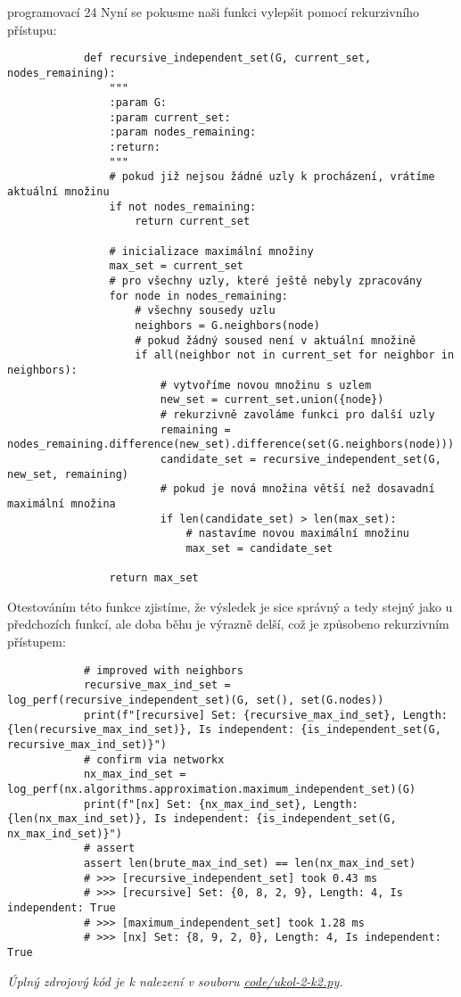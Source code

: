 \documentclass[10pt, a4paper]{ReportSheet}
\begin{document}
\begin{uloha}{programovací 2}{4}
        Nyní se pokusme naši funkci vylepšit pomocí rekurzivního přístupu:
        \begin{verbatim}
            def recursive_independent_set(G, current_set, nodes_remaining):
                """
                :param G:
                :param current_set:
                :param nodes_remaining:
                :return:
                """
                # pokud již nejsou žádné uzly k procházení, vrátíme aktuální množinu
                if not nodes_remaining:
                    return current_set

                # inicializace maximální množiny
                max_set = current_set
                # pro všechny uzly, které ještě nebyly zpracovány
                for node in nodes_remaining:
                    # všechny sousedy uzlu
                    neighbors = G.neighbors(node)
                    # pokud žádný soused není v aktuální množině
                    if all(neighbor not in current_set for neighbor in neighbors):
                        # vytvoříme novou množinu s uzlem
                        new_set = current_set.union({node})
                        # rekurzivně zavoláme funkci pro další uzly
                        remaining = nodes_remaining.difference(new_set).difference(set(G.neighbors(node)))
                        candidate_set = recursive_independent_set(G, new_set, remaining)
                        # pokud je nová množina větší než dosavadní maximální množina
                        if len(candidate_set) > len(max_set):
                            # nastavíme novou maximální množinu
                            max_set = candidate_set

                return max_set
        \end{verbatim}

        \clearpage
        Otestováním této funkce zjistíme, že výsledek je sice správný a tedy stejný jako u předchozích funkcí, ale doba
        běhu je výrazně delší, což je způsobeno rekurzivním přístupem:
        \begin{verbatim}
            # improved with neighbors
            recursive_max_ind_set = log_perf(recursive_independent_set)(G, set(), set(G.nodes))
            print(f"[recursive] Set: {recursive_max_ind_set}, Length: {len(recursive_max_ind_set)}, Is independent: {is_independent_set(G, recursive_max_ind_set)}")
            # confirm via networkx
            nx_max_ind_set = log_perf(nx.algorithms.approximation.maximum_independent_set)(G)
            print(f"[nx] Set: {nx_max_ind_set}, Length: {len(nx_max_ind_set)}, Is independent: {is_independent_set(G, nx_max_ind_set)}")
            # assert
            assert len(brute_max_ind_set) == len(nx_max_ind_set)
            # >>> [recursive_independent_set] took 0.43 ms
            # >>> [recursive] Set: {0, 8, 2, 9}, Length: 4, Is independent: True
            # >>> [maximum_independent_set] took 1.28 ms
            # >>> [nx] Set: {8, 9, 2, 0}, Length: 4, Is independent: True
        \end{verbatim}

        \textit{
            Úplný zdrojový kód je k nalezení v souboru \href{https://github.com/filipditrich/MMAD-2024/blob/main/code/ukol-2-k2.py}{code/ukol-2-k2.py}.
        }
    \end{uloha}
\end{document}
